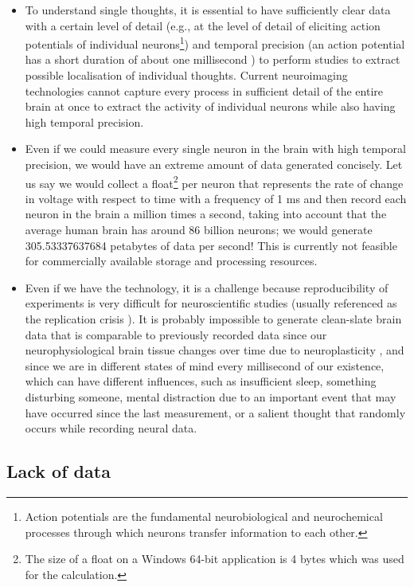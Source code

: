 \begin{itemize}
  \item To understand single thoughts, it is essential to have sufficiently clear data with a certain level of detail (e.g., at the level of detail of eliciting action potentials of individual neurons\footnote{Action potentials are the fundamental neurobiological and neurochemical processes through which neurons transfer information to each other.}) and temporal precision (an action potential has a short duration of about one millisecond \citep{byrne_resting_2021}) to perform studies to extract possible localisation of individual thoughts. Current neuroimaging technologies cannot capture every process in sufficient detail of the entire brain at once to extract the activity of individual neurons while also having high temporal precision.
  \item Even if we could measure every single neuron in the brain with high temporal precision, we would have an extreme amount of data generated concisely. Let us say we would collect a float\footnote{The size of a float on a Windows 64-bit application is 4 bytes which was used for the calculation.} per neuron that represents the rate of change in voltage with respect to time with a frequency of 1 ms and then record each neuron in the brain a million times a second, taking into account that the average human brain has around 86 billion neurons; we would generate 305.53337637684 petabytes of data per second! This is currently not feasible for commercially available storage and processing resources.
  \item Even if we have the technology, it is a challenge because reproducibility of experiments is very difficult for neuroscientific studies (usually referenced as the replication crisis \citep{maxwell_is_2015}). It is probably impossible to generate clean-slate brain data that is comparable to previously recorded data since our neurophysiological brain tissue changes over time due to neuroplasticity \citep{puderbaugh_neuroplasticity_2022}, and since we are in different states of mind every millisecond of our existence, which can have different influences, such as insufficient sleep, something disturbing someone, mental distraction due to an important event that may have occurred since the last measurement, or a salient thought that randomly occurs while recording neural data.
\end{itemize}

\subsection{Lack of data}
\label{chapter2-lack-of-data}

